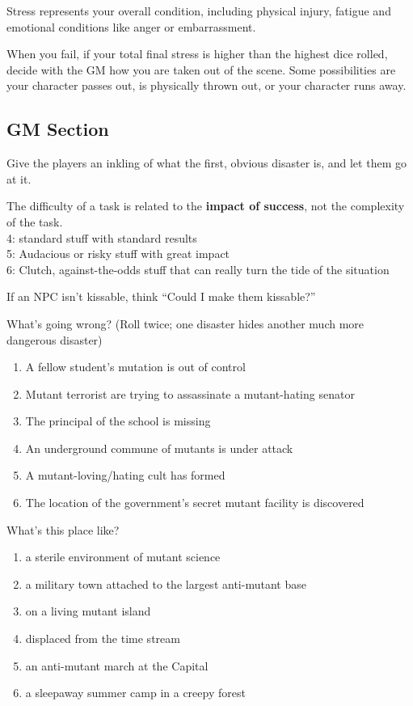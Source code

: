 \documentclass[twocolumn, 11pt
]{article}
\providecommand{\tightlist}{%
  \setlength{\itemsep}{0pt}\setlength{\parskip}{0pt}}
\begin{document}
Stress represents your overall condition, including physical injury,
fatigue and emotional conditions like anger or embarrassment.

When you fail, if your total final stress is higher than the highest
dice rolled, decide with the GM how you are taken out of the scene. Some
possibilities are your character passes out, is physically thrown out,
or your character runs away.

\hypertarget{gm-section}{%
\subsection{GM Section}\label{gm-section}}

Give the players an inkling of what the first, obvious disaster is, and
let them go at it.

The difficulty of a task is related to the \textbf{impact of success},
not the complexity of the task.\\
4: standard stuff with standard results\\
5: Audacious or risky stuff with great impact\\
6: Clutch, against-the-odds stuff that can really turn the tide of the
situation

If an NPC isn't kissable, think ``Could I make them kissable?''

What's going wrong? (Roll twice; one disaster hides another much more
dangerous disaster)

\begin{enumerate}
\def\labelenumi{\arabic{enumi}.}
\tightlist
\item
  A fellow student's mutation is out of control
\item
  Mutant terrorist are trying to assassinate a mutant-hating senator
\item
  The principal of the school is missing
\item
  An underground commune of mutants is under attack
\item
  A mutant-loving/hating cult has formed
\item
  The location of the government's secret mutant facility is discovered
\end{enumerate}

What's this place like?

\begin{enumerate}
\def\labelenumi{\arabic{enumi}.}
\tightlist
\item
  a sterile environment of mutant science
\item
  a military town attached to the largest anti-mutant base
\item
  on a living mutant island
\item
displaced from the time stream
\item
 an anti-mutant march at the Capital
\item
a sleepaway summer camp in a creepy forest
\end{enumerate}
\end{document}
